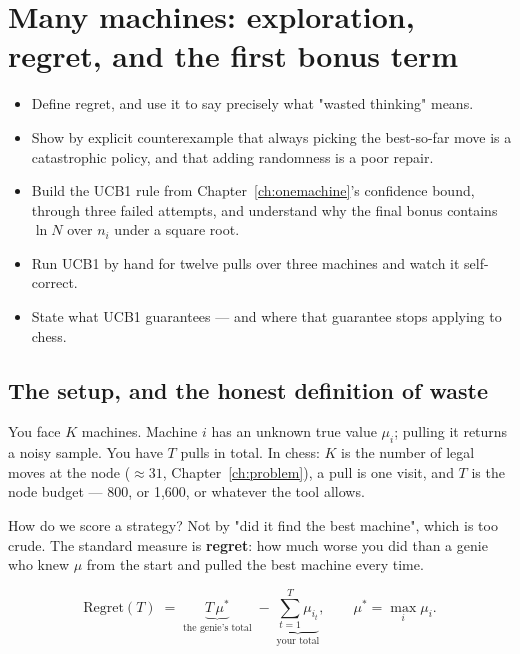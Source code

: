 \chapter{Many machines: exploration, regret, and the first bonus term}
\label{ch:manymachines}

\begin{objectives}
\begin{itemize}
\item Define regret, and use it to say precisely what "wasted thinking" means.
\item Show by explicit counterexample that always picking the best-so-far move is a
  catastrophic policy, and that adding randomness is a poor repair.
\item Build the UCB1 rule from Chapter~\ref{ch:onemachine}'s confidence bound, through
  three failed attempts, and understand why the final bonus contains $\ln N$ over $n_i$
  under a square root.
\item Run UCB1 by hand for twelve pulls over three machines and watch it self-correct.
\item State what UCB1 guarantees --- and where that guarantee stops applying to chess.
\end{itemize}
\end{objectives}

\section{The setup, and the honest definition of waste}

You face $K$ machines. Machine $i$ has an unknown true value $\mu_i$; pulling it returns a
noisy sample. You have $T$ pulls in total. In chess: $K$ is the number of legal moves at the
node ($\approx 31$, Chapter~\ref{ch:problem}), a pull is one visit, and $T$ is the node
budget --- 800, or 1{,}600, or whatever the tool allows.

How do we score a strategy? Not by "did it find the best machine", which is too crude. The
standard measure is \textbf{regret}: how much worse you did than a genie who knew $\mu$ from
the start and pulled the best machine every time.

\begin{equation}
  \label{eq:regret}
  \text{Regret}(T) \;=\; \underbrace{T\,\mu^{*}}_{\text{the genie's total}}
  \;-\; \underbrace{\sum_{t=1}^{T} \mu_{i_t}}_{\text{your total}},
  \qquad \mu^{*} = \max_i \mu_i .
\end{equation}

